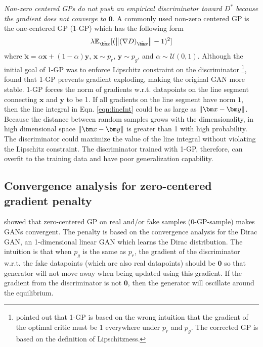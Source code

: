 \documentclass{article} %
\begin{document}
\emph{Non-zero centered GPs do not push an empirical discriminator toward $D^*$ because the gradient does not converge to $\bm 0$}. A commonly used non-zero centered GP is the one-centered GP (1-GP) \citep{wgangp} which has the following form
\begin{equation}
\lambda \mathbb{E}_{\tilde{\bm x}}[(\norm{(\nabla D)_{\tilde{\bm x}}} - 1)^2]
\end{equation} 
where $\tilde{\bm x} = \alpha \bm x + (1 - \alpha) \bm y$, $\bm x \sim p_r$, $\bm y \sim p_g$, and $\alpha \sim \mathcal{U}(0, 1)$. Although the initial goal of 1-GP was to enforce Lipschitz constraint on the discriminator \footnote{\cite{wganlp} pointed out that 1-GP is based on the wrong intuition that the gradient of the optimal critic must be 1 everywhere under $p_r$ and $p_g$. The corrected GP is based on the definition of Lipschitzness.}, \cite{manypatheq} found that 1-GP prevents gradient exploding, making the original GAN more stable.
1-GP forces the norm of gradients w.r.t. datapoints on the line segment connecting $\bm x$ and $\bm y$ to be 1. If all gradients on the line segment have norm $1$, then the line integral in Eqn. \ref{eqn:lineInt} could be as large as  $\norm{\bm x - \bm y}$. Because the distance between random samples grows with the dimensionality, in high dimensional space $\norm{\bm x - \bm y}$ is greater than 1 with high probability. The discriminator could maximize the value of the line integral without violating the Lipschitz constraint. The discriminator trained with 1-GP, therefore, can overfit to the training data and have poor generalization capability. 


\subsection{Convergence analysis for zero-centered gradient penalty}
\cite{whichGANConverge} showed that zero-centered GP on real and/or fake samples (0-GP-sample) makes GANs convergent. The penalty is based on the convergence analysis for the Dirac GAN, an 1-dimensional linear GAN which learns the Dirac distribution. The intuition is that when $p_g$ is the same as $p_r$, the gradient of the discriminator w.r.t. the fake datapoints (which are also real datapoints) should be $\bm 0$ so that generator will not move away when being updated using this gradient. If the gradient from the discriminator is not $\bm 0$, then the generator will oscillate around the equilibrium.
\end{document}
